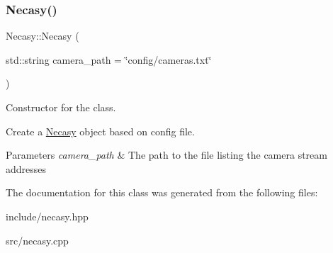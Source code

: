 \subsubsection{\texorpdfstring{Necasy()}{Necasy()}}
{\footnotesize\ttfamily Necasy\+::\+Necasy (\begin{DoxyParamCaption}\item[{std\+::string}]{camera\+\_\+path = {\ttfamily \char`\"{}config/cameras.txt\char`\"{}} }\end{DoxyParamCaption})}



Constructor for the class. 

Create a \hyperlink{classNecasy}{Necasy} object based on config file.


\begin{DoxyParams}{Parameters}
{\em camera\+\_\+path} & The path to the file listing the camera stream addresses \\
\hline
\end{DoxyParams}


The documentation for this class was generated from the following files\+:\begin{DoxyCompactItemize}
\item 
include/necasy.\+hpp\item 
src/necasy.\+cpp\end{DoxyCompactItemize}
